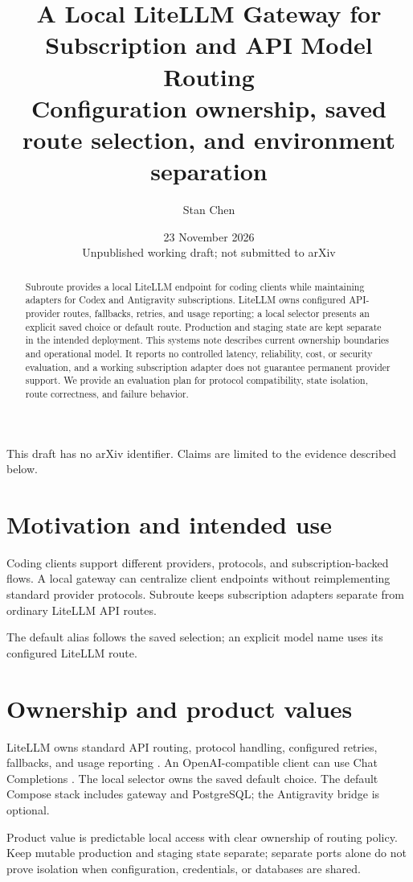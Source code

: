 \documentclass[11pt]{article}
\title{A Local LiteLLM Gateway for Subscription and API Model Routing\\\large Configuration ownership, saved route selection, and environment separation}
\author{Stan Chen}
\date{23 November 2026\\[4pt]\small Unpublished working draft; not submitted to arXiv}
\begin{document}
\maketitle
\begin{center}\small This draft has no arXiv identifier. Claims are limited to the evidence described below.\end{center}
\begin{abstract}
Subroute provides a local LiteLLM endpoint for coding clients \cite{r3} while maintaining adapters for Codex and Antigravity subscriptions. LiteLLM owns configured API-provider routes, fallbacks, retries, and usage reporting; a local selector presents an explicit saved choice or default route. Production and staging state are kept separate in the intended deployment. This systems note describes current ownership boundaries and operational model. It reports no controlled latency, reliability, cost, or security evaluation, and a working subscription adapter does not guarantee permanent provider support. We provide an evaluation plan for protocol compatibility, state isolation, route correctness, and failure behavior.
\end{abstract}
\section{Motivation and intended use}
Coding clients support different providers, protocols, and subscription-backed flows. A local gateway can centralize client endpoints without reimplementing standard provider protocols. Subroute keeps subscription adapters separate from ordinary LiteLLM API routes.\par
The default alias follows the saved selection; an explicit model name uses its configured LiteLLM route.\par
\section{Ownership and product values}
LiteLLM owns standard API routing, protocol handling, configured retries, fallbacks, and usage reporting \cite{r1}. An OpenAI-compatible client can use Chat Completions \cite{r2}. The local selector owns the saved default choice. The default Compose stack includes gateway and PostgreSQL; the Antigravity bridge is optional.\par
Product value is predictable local access with clear ownership of routing policy. Keep mutable production and staging state separate; separate ports alone do not prove isolation when configuration, credentials, or databases are shared.\par
\end{document}
